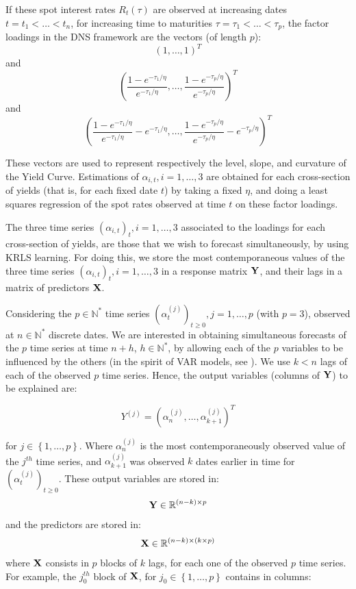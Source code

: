 \medskip

If these spot interest rates $R_t(\tau)$ are observed at increasing dates $t = t_1 < \ldots < t_n$, for increasing time to maturities $\tau = \tau_1 < \ldots < \tau_p$, the factor loadings in the DNS framework are the vectors (of length $p$):  
$$
(1, \ldots, 1)^T
$$
and
$$
\left(\frac{1-e^{-\tau_1/\eta}}{e^{-\tau_1/\eta}}, \ldots, \frac{1-e^{-\tau_p/\eta}}{e^{-\tau_p/\eta}}\right)^T
$$ 
and 
$$
\left(\frac{1-e^{-\tau_1/\eta}}{e^{-\tau_1/\eta}} - e^{-\tau_1/\eta}, \ldots, \frac{1-e^{-\tau_p/\eta}}{e^{-\tau_p/\eta}} - e^{-\tau_p/\eta}\right)^T
$$ 

\medskip

These vectors are used to represent respectively the level, slope, and curvature of the Yield Curve. Estimations of $\alpha_{i, t}, i = 1, \ldots, 3$ are obtained for each cross-section of yields (that is, for each fixed date $t$) by taking a fixed $\eta$, and doing a least squares regression of the spot rates observed at time $t$ on these factor loadings. 

\medskip

The three time series $(\alpha_{i, t})_t, i = 1, \ldots, 3$ associated to the loadings for each cross-section of yields, are those that we wish to forecast simultaneously, by using KRLS learning. For doing this, we store the most contemporaneous values of the three time series $(\alpha_{i, t})_t, i = 1, \ldots, 3$ in a response matrix ${\bf Y}$, and their lags in a matrix of predictors ${\bf X}$. 

\medskip

Considering the $p \in \mathbb{N}^*$ time series $(\alpha_t^{(j)})_{t \geq 0}, j = 1, \ldots, p$ (with $p = 3$),
observed at $n \in \mathbb{N}^*$ discrete dates. We are interested in
obtaining simultaneous forecasts of the $p$ time series at time $n+h$, $h \in
\mathbb{N}^*$, by allowing each of the $p$ variables to be influenced by the
others (in the spirit of VAR models, see \cite{lutkepohl2005new}). We use $k < n$ lags of each of the observed $p$ time series. Hence, the output variables (columns of ${\bf Y}$) to be explained are:

\begin{equation}
Y^{(j)} = \left(\alpha^{(j)}_n, \ldots, \alpha^{(j)}_{k+1} \right)^T
\end{equation}

for $j \in \left\lbrace 1, \ldots,
p \right\rbrace$. Where $\alpha^{(j)}_n$ is the most contemporaneously observed value
of the $j^{th}$ time series, and $\alpha^{(j)}_{k+1}$ was observed $k$ dates earlier
in time for $(\alpha^{(j)}_t)_{t \geq 0}$. These output variables are stored in: $$ {\bf Y} \in \mathbb{R}^{(n-k) \times p} $$ and the predictors are
stored in: $$ {\bf X} \in \mathbb{R}^{(n-k) \times (k \times p)} $$
where ${\bf X}$ consists in $p$ blocks of $k$ lags, for each one of the observed
$p$ time series. For example, the $j_0^{th}$ block of ${\bf X}$, for $j_0 \in
\left\lbrace 1, \ldots, p \right\rbrace$  contains in columns:


